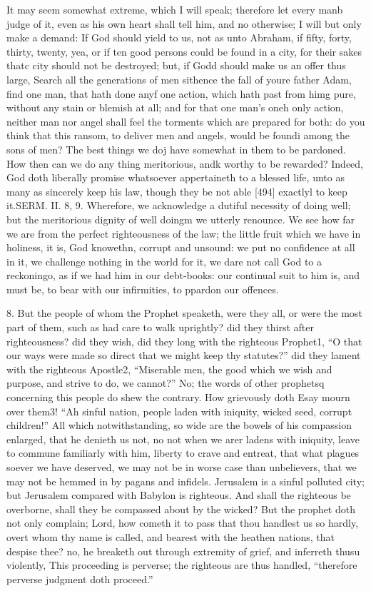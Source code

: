 It may seem somewhat extreme, which I will speak; therefore let every manb judge of it, even as his own heart shall tell him, and no otherwise; I will but only make a demand: If God should yield to us, not as unto Abraham, if fifty, forty, thirty, twenty, yea, or if ten good persons could be found in a city, for their sakes thatc city should not be destroyed; but, if Godd should make us an offer thus large, Search all the generations of men sithence the fall of youre father Adam, find one man, that hath done anyf one action, which hath past from himg pure, without any stain or blemish at all; and for that one man’s oneh only action, neither man nor angel shall feel the torments which are prepared for both: do you think that this ransom, to deliver men and angels, would be foundi among the sons of men? The best things we doj have somewhat in them to be pardoned. How then can we do any thing meritorious, andk worthy to be rewarded? Indeed, God doth liberally promise whatsoever appertaineth to a blessed life, unto as many as sincerely keep his law, though they be not able [494] exactlyl to keep it.SERM. II. 8, 9. Wherefore, we acknowledge a dutiful necessity of doing well; but the meritorious dignity of well doingm we utterly renounce. We see how far we are from the perfect righteousness of the law; the little fruit which we have in holiness, it is, God knowethn, corrupt and unsound: we put no confidence at all in it, we challenge nothing in the world for it, we dare not call God to a reckoningo, as if we had him in our debt-books: our continual suit to him is, and must be, to bear with our infirmities, to ppardon our offences.

8. But the people of whom the Prophet speaketh, were they all, or were the most part of them, such as had care to walk uprightly? did they thirst after righteousness? did they wish, did they long with the righteous Prophet1, “O that our ways were made so direct that we might keep thy statutes?” did they lament with the righteous Apostle2, “Miserable men, the good which we wish and purpose, and strive to do, we cannot?” No; the words of other prophetsq concerning this people do shew the contrary. How grievously doth Esay mourn over them3! “Ah sinful nation, people laden with iniquity, wicked seed, corrupt children!” All which notwithstanding, so wide are the bowels of his compassion enlarged, that he denieth us not, no not when we arer ladens with iniquity, leave to commune familiarly with him, liberty to crave and entreat, that what plagues soever we have deserved, we may not be in worse case than unbelievers, that we may not be hemmed in by pagans and infidels. Jerusalem is a sinful polluted city; but Jerusalem compared with Babylon is righteous. And shall the righteous be overborne, shall they be compassed about by the wicked? But the prophet doth not only complain; Lord, how cometh it to pass that thou handlest us so hardly, overt whom thy name is called, and bearest with the heathen nations, that despise thee? no, he breaketh out through extremity of grief, and inferreth thusu violently, This proceeding is perverse; the righteous are thus handled, “therefore perverse judgment doth proceed.”

